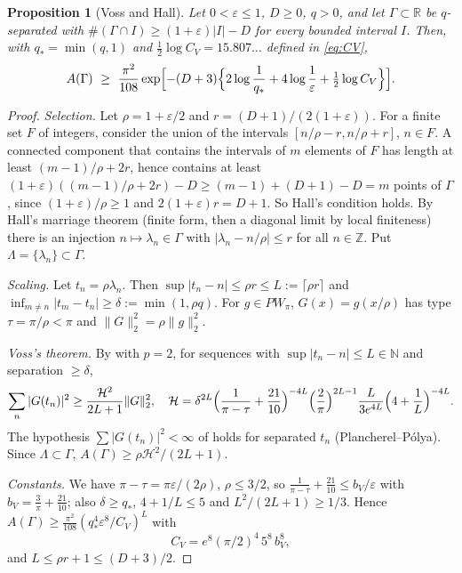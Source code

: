 \documentclass[11pt]{amsart}
\newtheorem{proposition}{Proposition}[section]
\theoremstyle{definition}
\theoremstyle{remark}
\numberwithin{equation}{section}
\newcommand{\R}{\mathbb{R}}
\newcommand{\Z}{\mathbb{Z}}
\begin{document}
\begin{proposition}[Voss and Hall]\label{prop:V}
Let $0<\varepsilon\le1$, $D\ge0$, $q>0$, and let $\Gamma\subset\R$ be $q$-separated with $\#(\Gamma\cap I)\ge(1+\varepsilon)|I|-D$ for every bounded interval $I$. Then, with $q_*=\min(q,1)$ and $\frac12\log C_V=15.807\ldots$ defined in \eqref{eq:CV},
\[
A(\Gamma)\ \ge\ \frac{\pi^2}{108}\exp\Bigl[-(D+3)\Bigl\{2\log\frac1{q_*}+4\log\frac1\varepsilon+\tfrac12\log C_V\Bigr\}\Bigr].
\]
\end{proposition}
\begin{proof}
\emph{Selection.} Let $\rho=1+\varepsilon/2$ and $r=(D+1)/(2(1+\varepsilon))$. For a finite set $F$ of integers, consider the union of the intervals $[n/\rho-r,n/\rho+r]$, $n\in F$. A connected component that contains the intervals of $m$ elements of $F$ has length at least $(m-1)/\rho+2r$, hence contains at least $(1+\varepsilon)((m-1)/\rho+2r)-D\ge(m-1)+(D+1)-D=m$ points of $\Gamma$, since $(1+\varepsilon)/\rho\ge1$ and $2(1+\varepsilon)r=D+1$. So Hall's condition holds. By Hall's marriage theorem (finite form, then a diagonal limit by local finiteness) there is an injection $n\mapsto\lambda_n\in\Gamma$ with $|\lambda_n-n/\rho|\le r$ for all $n\in\Z$. Put $\Lambda=\{\lambda_n\}\subset\Gamma$.

\emph{Scaling.} Let $t_n=\rho\lambda_n$. Then $\sup|t_n-n|\le\rho r\le L:=\lceil\rho r\rceil$ and $\inf_{m\ne n}|t_m-t_n|\ge\delta:=\min(1,\rho q)$. For $g\in PW_\pi$, $G(x)=g(x/\rho)$ has type $\tau=\pi/\rho<\pi$ and $\|G\|_2^2=\rho\|g\|_2^2$.

\emph{Voss's theorem.} By \cite[Thm.~2 and Cor.~1, (1.6)]{Voss99} with $p=2$, for sequences with $\sup|t_n-n|\le L\in\mathbb N$ and separation $\ge\delta$,
\[
\sum_n|G(t_n)|^2\ge\frac{\mathcal H^2}{2L+1}\|G\|_2^2,\quad
\mathcal H=\delta^{2L}\Bigl(\frac1{\pi-\tau}+\frac{21}{10}\Bigr)^{-4L}\Bigl(\frac2\pi\Bigr)^{2L-1}\frac L{3e^{4L}}\Bigl(4+\frac1L\Bigr)^{-4L}.
\]
The hypothesis $\sum|G(t_n)|^2<\infty$ of \cite[Thm.~2]{Voss99} holds for separated $t_n$ (Plancherel--P\'olya). Since $\Lambda\subset\Gamma$, $A(\Gamma)\ge\rho\mathcal H^2/(2L+1)$.

\emph{Constants.} We have $\pi-\tau=\pi\varepsilon/(2\rho)$, $\rho\le3/2$, so $\frac1{\pi-\tau}+\frac{21}{10}\le b_V/\varepsilon$ with $b_V=\frac3\pi+\frac{21}{10}$; also $\delta\ge q_*$, $4+1/L\le5$ and $L^2/(2L+1)\ge1/3$. Hence $A(\Gamma)\ge\frac{\pi^2}{108}(q_*^4\varepsilon^8/C_V)^L$ with
\begin{equation}\label{eq:CV}
C_V=e^8(\pi/2)^4\,5^8\,b_V^8,
\end{equation}
and $L\le\rho r+1\le(D+3)/2$.
\end{proof}
\end{document}
